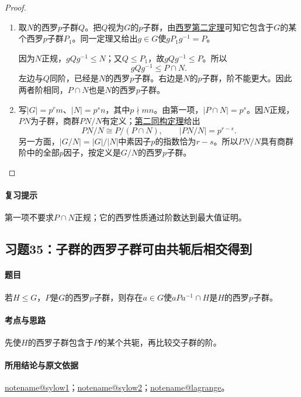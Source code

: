 \documentclass[UTF8,a4paper,11pt,fontset=windows]{ctexart}
\makeatletter
\newcommand{\noteref}[1]{\hyperref[note:#1]{\csname notename@#1\endcsname}}
\newcommand{\proofref}[2]{\hyperref[note:#1]{#2}}
\newcommand{\exref}[2]{\hyperref[ex:#1:#2]{第#1章习题#2}}
\makeatother
\begin{document}

\begin{proof}
\begin{enumerate}
\item 取$N$的西罗$p$子群$Q$。把$Q$视为$G$的$p$子群，由\proofref{sylow2}{西罗第二定理}可知它包含于$G$的某个西罗$p$子群$P_1$。同一定理又给出$g\in G$使$gP_1g^{-1}=P$。

因为$N$正规，$gQg^{-1}\leq N$；又$Q\leq P_1$，故$gQg^{-1}\leq P$。所以
\[
gQg^{-1}\leq P\cap N.
\]
左边与$Q$同阶，已经是$N$的西罗$p$子群。右边是$N$的$p$子群，阶不能更大。因此两者阶相同，$P\cap N$也是$N$的西罗$p$子群。

\item 写$|G|=p^rm$、$|N|=p^sn$，其中$p\nmid mn$。由第一项，$|P\cap N|=p^s$。因$N$正规，$PN$为子群，商群$PN/N$有定义；\proofref{secondiso}{第二同构定理}给出
\[
PN/N\cong P/(P\cap N),\qquad |PN/N|=p^{r-s}.
\]
另一方面，$|G/N|=|G|/|N|$中素因子$p$的指数恰为$r-s$。所以$PN/N$具有商群阶中的全部$p$因子，按定义是$G/N$的西罗$p$子群。
\end{enumerate}
\end{proof}

\paragraph{复习提示}
第一项不要求$P\cap N$正规；它的西罗性质通过阶数达到最大值证明。


\subsection{习题35：\texorpdfstring{子群的西罗子群可由共轭后相交得到}{子群的西罗子群可由共轭后相交得到}}
\label{ex:2:35}

\paragraph{题目}
若$H\leq G$，$P$是$G$的西罗$p$子群，则存在$a\in G$使$aPa^{-1}\cap H$是$H$的西罗$p$子群。

\paragraph{考点与思路}
先使$H$的西罗子群包含于$P$的某个共轭，再比较交子群的阶。

\paragraph{所用结论与原文依据}
\noteref{sylow1}；\noteref{sylow2}；\noteref{lagrange}。
\end{document}
